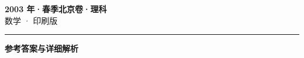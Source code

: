 \documentclass[zihao=5, a4paper]{ctexart}
\begin{document}
\begin{center}
  {\Large\bfseries 2003 年·春季北京卷·理科}\\[4pt]
  {\large 数学 · 印刷版}
\end{center}
\medskip
{}

\par\bigskip\hrule\bigskip
{}
\begin{center}{\large\bfseries 参考答案与详细解析}\end{center}
\smallskip

\end{document}
